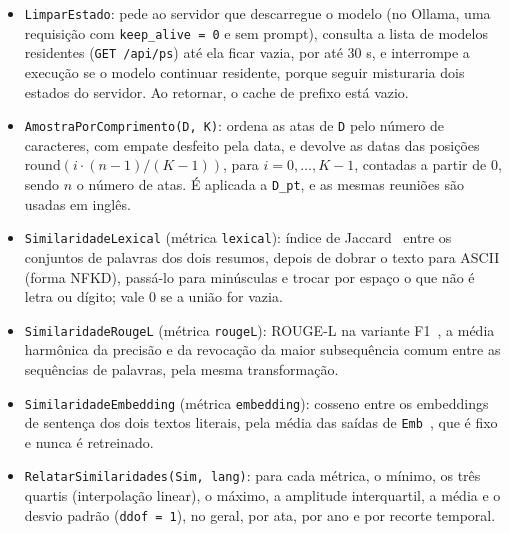 \documentclass[12pt]{article}
\begin{document}
\begin{itemize}
\item \texttt{LimparEstado}: pede ao servidor que descarregue o modelo (no
  Ollama, uma requisição com \texttt{keep\_alive = 0} e sem prompt), consulta a
  lista de modelos residentes (\texttt{GET /api/ps}) até ela ficar vazia, por
  até 30 s, e interrompe a execução se o modelo continuar residente, porque
  seguir misturaria dois estados do servidor. Ao retornar, o cache de prefixo
  está vazio.
\item \texttt{AmostraPorComprimento(D, K)}: ordena as atas de \texttt{D} pelo
  número de caracteres, com empate desfeito pela data, e devolve as datas das
  posições $\mathrm{round}(i \cdot (n - 1)/(K - 1))$, para
  $i = 0, \ldots, K - 1$, contadas a partir de 0, sendo $n$ o número de atas. É
  aplicada a \texttt{D\_pt}, e as mesmas reuniões são usadas em inglês.
\item \texttt{SimilaridadeLexical} (métrica \texttt{lexical}): índice de
  Jaccard~\cite{jaccard1912} entre os conjuntos de palavras dos dois resumos,
  depois de dobrar o texto para ASCII (forma NFKD), passá-lo para minúsculas e
  trocar por espaço o que não é letra ou dígito; vale 0 se a união for vazia.
\item \texttt{SimilaridadeRougeL} (métrica \texttt{rougeL}): ROUGE-L na
  variante F1~\cite{lin2004}, a média harmônica da precisão e da revocação da
  maior subsequência comum entre as sequências de palavras, pela mesma
  transformação.
\item \texttt{SimilaridadeEmbedding} (métrica \texttt{embedding}): cosseno
  entre os embeddings de sentença dos dois textos literais, pela média das
  saídas de \texttt{Emb}~\cite{reimers2019}, que é fixo e nunca é retreinado.
\item \texttt{RelatarSimilaridades(Sim, lang)}: para cada métrica, o mínimo, os
  três quartis (interpolação linear), o máximo, a amplitude interquartil, a
  média e o desvio padrão (\texttt{ddof = 1}), no geral, por ata, por ano e por
  recorte temporal.
\end{itemize}
\end{document}
